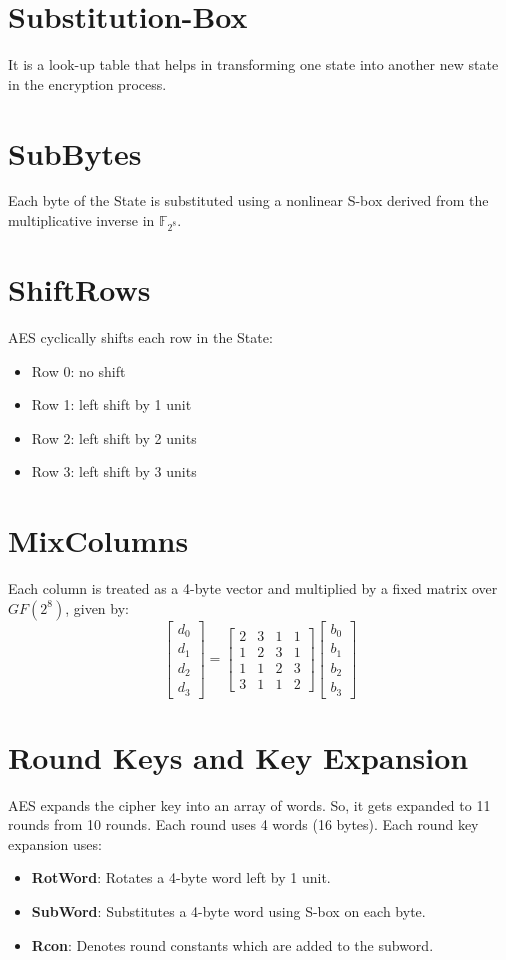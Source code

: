 \documentclass[12pt,a4paper]{report}
\begin{document}
\section{Substitution-Box}
It is a look-up table that helps in transforming one state into another new state in the encryption process.

\section{SubBytes}
Each byte of the State is substituted using a nonlinear S-box derived from the multiplicative inverse in $\mathbb{F}_{2^8}$.

\section{ShiftRows}
AES cyclically shifts each row in the State:
\begin{itemize}
\item Row 0: no shift
\item Row 1: left shift by 1 unit
\item Row 2: left shift by 2 units
\item Row 3: left shift by 3 units
\end{itemize}

\section{MixColumns}
Each column is treated as a 4-byte vector and multiplied by a fixed matrix over $GF(2^8)$, given by:
\[
\begin{bmatrix}
d_0 \\
d_1 \\         
d_2 \\
d_3
\end{bmatrix}
=
\begin{bmatrix}
2 & 3 & 1 & 1 \\
1 & 2 & 3 & 1 \\         
1 & 1 & 2 & 3 \\
3 & 1 & 1 & 2
\end{bmatrix}
\begin{bmatrix}
b_0 \\
b_1 \\         
b_2 \\
b_3
\end{bmatrix}
\]

\section{Round Keys and Key Expansion}
AES expands the cipher key into an array of words. So, it gets expanded to 11 rounds from 10 rounds. Each round uses 4 words (16 bytes). Each round key expansion uses:
\begin{itemize}
\item \textbf{RotWord}: Rotates a 4-byte word left by 1 unit.
\item \textbf{SubWord}: Substitutes a 4-byte word using S-box on each byte.
\item \textbf{Rcon}: Denotes round constants which are added to the subword.
\end{itemize}
\end{document}
